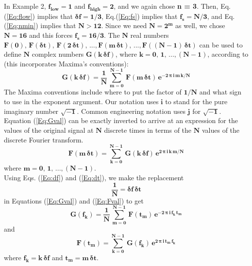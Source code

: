 \documentclass[11pt]{article}
\begin{document}
\noindent In Example 2, $\mathbf{f_{low} = 1}$ and $\mathbf{f_{high} = 2}$, and we again
  chose \textbf{n = 3}. 
Then, Eq.(\ref{Eq:flow}) implies that $\mathbf{\boldsymbol{\delta}f = 1/3}$,
   Eq.(\ref{Eq:fs}) implies that $\mathbf{f_{s} = N/3}$,
   and Eq.(\ref{Eq:nmin}) implies that $\mathbf{N > 12}$.
Since we need $\mathbf{N = 2^{m}}$ as well, we chose $\mathbf{N = 16}$ and 
  this forces $\mathbf{f_{s} = 16/3}$.
\newpage
\noindent The $\mathbf{N}$ real numbers $\mathbf{F(0),\,F(\boldsymbol{\delta}t),\,
  F(2\,\boldsymbol{\delta}t),\,..., F(m\,\boldsymbol{\delta}t),\,..., F((N-1)\,\boldsymbol{\delta}t) }$
  can be used to define $\mathbf{N}$ complex numbers $\mathbf{G(k\,\boldsymbol{\delta}f)}$, where
  $\mathbf{k = 0,\,1,\, ... ,(N - 1)}$, according to (this incorporates Maxima's conventions):
\begin{equation}  \label{Eq:Gval}
\mathbf{G(k\,\boldsymbol{\delta}f)} = 
  \mathbf{\frac{1}{N}\,\sum_{m = 0}^{N - 1}\, F(m\,\boldsymbol{\delta}t)\,
               e^{-2\,\boldsymbol{\pi}\,i\,m\,k/N}}
\end{equation}
The Maxima conventions include where to put the factor of $\mathbf{1/N}$ and
  what sign to use in the exponent argument.
Our notation uses $\mathbf{i}$ to stand for the pure imaginary number $\mathbf{\sqrt{-1}}$.
Common engineering notation uses $\mathbf{j}$ for $\mathbf{\sqrt{-1}}$.\\

\noindent Equation (\ref{Eq:Gval}) can be exactly inverted to arrive at an
  expression for the values of the original signal at $\mathbf{N}$ discrete
  times in terms of the $\mathbf{N}$ values of the discrete Fourier transform.
\begin{equation}  \label{Eq:Fval}
\mathbf{F(m\,\boldsymbol{\delta}t)} = 
  \mathbf{\sum_{k = 0}^{N - 1}\, G(k\,\boldsymbol{\delta}f)\,
               e^{2\,\boldsymbol{\pi}\,i\,k\,m/N}}
\end{equation}
where $\mathbf{m = 0,\,1,\, ... ,(N - 1)}$.\\

\noindent Using Eqs. (\ref{Eq:df}) and (\ref{Eq:dt}), we make the replacement
\begin{equation}  \label{Eq:dfdt}
\mathbf{\frac{1}{N} =  \boldsymbol{\delta}f \, \boldsymbol{\delta}t }
\end{equation}
in Equations (\ref{Eq:Gval}) and (\ref{Eq:Fval}) to get
\begin{equation} \label{Eq:Gfk}
\mathbf{G(f_{k})} = 
  \mathbf{\frac{1}{N}\,\sum_{m = 0}^{N - 1}\, F(t_{m})\,
               e^{-2\,\boldsymbol{\pi}\,i\,f_{k}\,t_{m}}}
\end{equation}
and
\begin{equation}
\mathbf{F(t_{m})} = 
  \mathbf{\sum_{k = 0}^{N - 1}\, G(f_{k})\,
               e^{2\,\boldsymbol{\pi}\,i\,t_{m} \, f_{k}}}
\end{equation}
where $\mathbf{f_{k}} = \mathbf{k\,\boldsymbol{\delta}f}$ 
  and $\mathbf{t_{m}} = \mathbf{m\,\boldsymbol{\delta}t}$.\\
  
\end{document}
